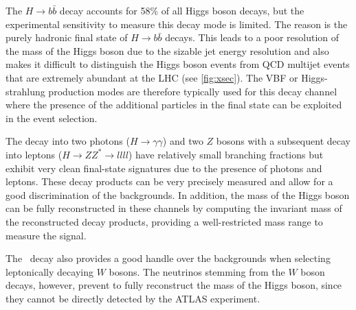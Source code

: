 The $H\rightarrow b\bar{b}$ decay accounts for 58\% of all Higgs boson decays, but the experimental sensitivity to measure this decay mode is limited. The reason is the purely hadronic final state of $H\rightarrow b\bar{b}$ decays. 
This leads to a poor resolution of the mass of the Higgs boson due to the sizable jet energy resolution and also makes it difficult to distinguish the Higgs boson events from QCD multijet events that are extremely abundant at the LHC (see \cref{fig:xsec}).
The VBF or Higgs-strahlung production modes are therefore typically used for this decay channel where the presence of the additional particles in the final state can be exploited in the event selection.

The decay into two photons ($H \to \gamma\gamma$) and two $Z$ bosons with a subsequent decay into leptons ($H \to ZZ^* \to llll$) have relatively small branching fractions but exhibit very clean final-state signatures due to the presence of photons and leptons. These decay products can be very precisely measured and allow for a good discrimination of the backgrounds.
In addition, the mass of the Higgs boson can be fully reconstructed in these channels by computing the invariant mass of the reconstructed decay products, providing a well-restricted mass range to measure the signal.

The \HWW\ decay also provides a good handle over the backgrounds when selecting leptonically decaying $W$ bosons.
The neutrinos stemming from the $W$ boson decays, however, prevent to fully reconstruct the mass of the Higgs boson, since they cannot be directly detected by the ATLAS experiment.

